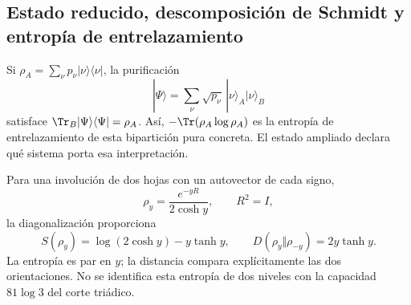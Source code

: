 

\pagebreak %
\subsection{Estado reducido, descomposición de Schmidt y entropía de entrelazamiento}
Si $\rho_A=\sum_\nu p_\nu|\nu\rangle\langle\nu|$,
la purificación
\[
|\Psi\rangle=\sum_\nu\sqrt{p_\nu}\,
|\nu\rangle_A|\nu\rangle_B
\]
satisface $\Tr_B|\Psi\rangle\langle\Psi|=\rho_A$.
Así, $-\Tr(\rho_A\log\rho_A)$ es la entropía de entrelazamiento
de esta bipartición pura concreta. El estado ampliado declara
qué sistema porta esa interpretación.

Para una involución de dos hojas con un autovector de cada signo,
\[
\rho_y=\frac{e^{-yR}}{2\cosh y},\qquad R^2=I,
\]
la diagonalización proporciona
\[
S(\rho_y)=\log(2\cosh y)-y\tanh y,\qquad
D(\rho_y\Vert\rho_{-y})=2y\tanh y.
\]
La entropía es par en $y$; la distancia compara explícitamente
las dos orientaciones. No se identifica esta entropía de dos niveles
con la capacidad $81\log3$ del corte triádico.
